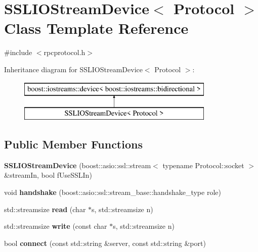 \hypertarget{class_s_s_l_i_o_stream_device}{}\section{S\+S\+L\+I\+O\+Stream\+Device$<$ Protocol $>$ Class Template Reference}
\label{class_s_s_l_i_o_stream_device}


{\ttfamily \#include $<$rpcprotocol.\+h$>$}

Inheritance diagram for S\+S\+L\+I\+O\+Stream\+Device$<$ Protocol $>$\+:\begin{figure}[H]
\begin{center}
\leavevmode
\includegraphics[height=2.000000cm]{class_s_s_l_i_o_stream_device}
\end{center}
\end{figure}
\subsection*{Public Member Functions}
\begin{DoxyCompactItemize}
\item 
\mbox{\label{class_s_s_l_i_o_stream_device_a603e5709babdeaaa68c159a2895d7f2e}} 
{\bfseries S\+S\+L\+I\+O\+Stream\+Device} (boost\+::asio\+::ssl\+::stream$<$ typename Protocol\+::socket $>$ \&stream\+In, bool f\+Use\+S\+S\+L\+In)
\item 
\mbox{\label{class_s_s_l_i_o_stream_device_a6607d02de410f1c731bf1dcf3bac9bb5}} 
void {\bfseries handshake} (boost\+::asio\+::ssl\+::stream\+\_\+base\+::handshake\+\_\+type role)
\item 
\mbox{\label{class_s_s_l_i_o_stream_device_a8beb626f163adac311a5ec507c3e495a}} 
std\+::streamsize {\bfseries read} (char $\ast$s, std\+::streamsize n)
\item 
\mbox{\label{class_s_s_l_i_o_stream_device_aa4bfad893484ffdf9dbcdce97c462ad0}} 
std\+::streamsize {\bfseries write} (const char $\ast$s, std\+::streamsize n)
\item 
\mbox{\label{class_s_s_l_i_o_stream_device_acdded14a6c79e263989ebf8aea392405}} 
bool {\bfseries connect} (const std\+::string \&server, const std\+::string \&port)
\end{DoxyCompactItemize}


